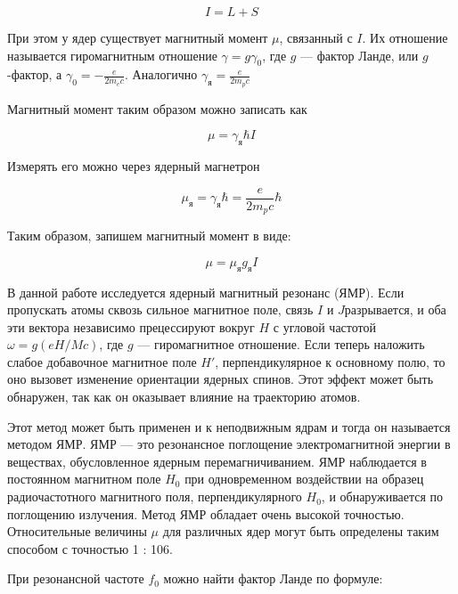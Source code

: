 \documentclass[12pt]{kiarticle}
\begin{document}
	\begin{equation}\label{}
	I = L + S
	\end{equation} 
	
	При этом у ядер существует магнитный момент $ \mu $, связанный с $ I $. Их отношение называется гиромагнитным отношение $ \gamma = g \gamma_0 $, где $ g $ --- фактор Ланде, или $ g $-фактор, а $ \gamma_0 = -\frac{e}{2m_ec} $. Аналогично  $ \gamma_я = \frac{e}{2m_pc} $
	
	Магнитный момент таким образом можно записать как 
	
	\begin{equation}\label{}
	\mu = \gamma_я \hbar I 
	\end{equation}
	
	Измерять его можно через ядерный магнетрон
	
	\begin{equation}\label{}
	\mu_я = \gamma_я \hbar = \frac{e}{2m_pc} \hbar 
	\end{equation}
	
	Таким образом, запишем магнитный момент в виде:
	
	\begin{equation}\label{mu}
	\mu = \mu_я g_я I
	\end{equation}

	
	В данной работе исследуется ядерный магнитный резонанс (ЯМР). Если пропускать
	атомы сквозь сильное магнитное поле, связь $ I $ и $ J  $разрывается, и
	оба эти вектора независимо прецессируют вокруг $ H $ с угловой частотой
	$ \omega = g(eH/Mc) $, где $ g $ --- гиромагнитное отношение. Если теперь наложить слабое добавочное магнитное поле $ H' $, перпендикулярное к основному полю, то оно вызовет изменение ориентации ядерных спинов.
	Этот эффект может быть обнаружен, так как он оказывает влияние
	на траекторию атомов.
	
	Этот метод может быть применен и к неподвижным ядрам и тогда он называется методом ЯМР. ЯМР --- это резонансное поглощение
	электромагнитной энергии в веществах, обусловленное ядерным перемагничиванием. ЯМР наблюдается в постоянном магнитном поле $ H_0 $ при одновременном воздействии на образец радиочастотного магнитного поля, перпендикулярного $ H_0 $, и обнаруживается по поглощению излучения. Метод
	ЯМР обладает очень высокой точностью. Относительные величины $ \mu $
	для различных ядер могут быть определены таким способом с точностью 1 : 106.
	
	При резонансной частоте $ f_0 $ можно найти фактор Ланде по формуле:
	
\end{document}
